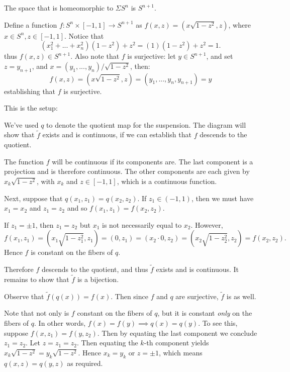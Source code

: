 \documentclass{homework651}
\newcommand\ra{\rightarrow}
\begin{document}
\begin{aproblems}
\solution
The space that is homeomorphic to $\Sigma S^n$ is $S^{n+1}$.

Define a function $f:S^n\times[-1,1]\ra S^{n+1}$ as $f(x,z)=(x \sqrt{1-z^2}, z)$,
where $x\in S^n, z\in [-1,1]$.  Notice that
$$ (x_1^2+...+x_n^2)(1-z^2) + z^2 = (1)(1-z^2)+z^2=1. $$
thus $f(x,z)\in S^{n+1}$. Also note that $f$ is surjective: let $y\in S^{n+1}$,
and set $z=y_{n+1}$, and $x=(y_1,...,y_n)/\sqrt{1-z^2}$, then:
$$ f(x,z)=(x \sqrt{1-z^2}, z)=(y_1,...,y_n,y_{n+1})=y $$
establishing that $f$ is surjective.

This is the setup:

\centerline{
}

We've used $q$ to denote the quotient map for the suspension.  The diagram
will show that $\tilde f$ exists and is continuous,
if we can establish that $f$ descends to
the quotient.

The function $f$ will be continuous if its components are.  The last component
is a projection and is therefore continuous.  The other components are each
given by $x_k \sqrt{1-z^2}$, with $x_k$ and $z\in[-1,1]$, which is a continuous
function.

Next, suppose that $q(x_1,z_1)=q(x_2,z_2)$.
If $z_1 \in (-1,1)$,
then we must have $x_1=x_2$ and $z_1=z_2$ and so
$f(x_1,z_1)=f(x_2,z_2)$.

If $z_1=\pm 1$, then $z_1=z_2$ but $x_1$ is not necessarily equal to $x_2$. However,
$$ f(x_1,z_1) = (x_1\sqrt{1-z_1^2}, z_1)=(0,z_1)=(x_2\cdot 0, z_2)=(x_2\sqrt{1-z_2^2},z_2)=f(x_2,z_2). $$
Hence $f$ is constant on the fibers of $q$.

Therefore $f$ descends to the quotient, and thus $\tilde f$ exists and is
continuous.  It remains to show that $\tilde f$ is a bijection.

Observe that $\tilde f(q(x))=f(x)$.  Then since $f$ and $q$ are surjective, $\tilde f$ is
as well.

Note that not only is $f$ constant on the fibers of $q$, but it is
constant \emph{only} on the fibers of $q$.  In other words,
$f(x)=f(y)\implies q(x)=q(y)$.  To see this, suppose $f(x,z_1)=f(y,z_2)$.
Then by equating
the last component we conclude $z_1=z_2$.  Let $z=z_1=z_2$.
Then equating the $k$-th
component yields $x_k\sqrt{1-z^2}=y_k\sqrt{1-z^2}$.  Hence $x_k=y_k$ or
$z=\pm 1$, which means $q(x,z)=q(y,z)$ as required.


\end{aproblems}
\end{document}
